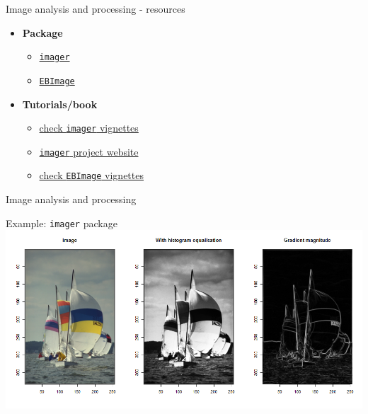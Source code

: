 \documentclass[8pt,ignorenonframetext,]{beamer}
\providecommand{\tightlist}{%
  \setlength{\itemsep}{0pt}\setlength{\parskip}{0pt}}
\begin{document}
\begin{frame}[fragile]{Image analysis and processing - resources}

\begin{itemize}
\tightlist
\item
  \textbf{Package}

  \begin{itemize}
  \tightlist
  \item
    \href{https://cran.r-project.org/web/packages/imager/index.html}{\texttt{imager}}
  \item
    \href{https://cran.r-project.org/web/packages/EBImage/index.html}{\texttt{EBImage}}
  \end{itemize}
\item
  \textbf{Tutorials/book}

  \begin{itemize}
  \tightlist
  \item
    \href{https://cran.r-project.org/web/packages/imager/index.html}{check
    \texttt{imager} vignettes}
  \item
    \href{https://dahtah.github.io/imager/}{\texttt{imager} project
    website}
  \item
    \href{https://www.bioconductor.org/packages/3.7/bioc/vignettes/EBImage/inst/doc/EBImage-introduction.html}{check
    \texttt{EBImage} vignettes}
  \end{itemize}
\end{itemize}

\end{frame}

\begin{frame}[fragile]{Image analysis and processing}

Example: \texttt{imager} package
\includegraphics{imgPres/image_processing.png}

\end{frame}
\end{document}
